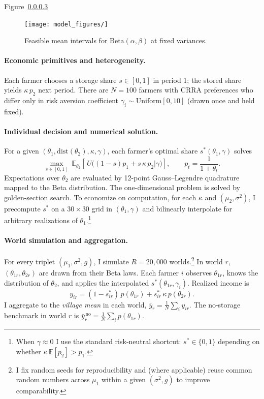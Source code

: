 Figure~\ref{}



\begin{figure}[ht!]
    \centering
    \texttt{[image: model\_figures/]}
    \caption{Feasible mean intervals for $\text{Beta}(\alpha,\beta)$ at fixed variances.}
    \label{fig:parameter_range_Beta_distribution}
\end{figure}


\paragraph{Economic primitives and heterogeneity.}
Each farmer chooses a storage share $s\in[0,1]$ in period 1; the stored share yields $\kappa\,p_2$ next period. There are $N=100$ farmers with CRRA preferences who differ only in risk aversion coefficient $\gamma_i\sim \mathrm{Uniform}[0,10]$ (drawn once and held fixed).

\paragraph{Individual decision and numerical solution.}
For a given $(\theta_1,\text{dist}(\theta_2),\kappa,\gamma)$, each farmer's optimal share $s^*(\theta_1,\gamma)$ solves
\[
\max_{s\in[0,1]} \; \mathbb{E}_{\theta_2}\!\left[\,U\!\big((1-s)p_1+s\,\kappa\,p_2|\gamma\big)\right],
\qquad p_t=\frac{1}{1+\theta_t}.
\]
Expectations over $\theta_2$ are evaluated by 12-point Gauss--Legendre quadrature mapped to the Beta distribution. The one-dimensional problem is solved by golden-section search. To economize on computation, for each $\kappa$ and $(\mu_2,\sigma^2)$, I precompute $s^*$ on a $30\times 30$ grid in $(\theta_1,\gamma)$ and bilinearly interpolate for arbitrary realizations of $\theta_1$.\footnote{When $\gamma\approx 0$ I use the standard risk-neutral shortcut: $s^*\in\{0,1\}$ depending on whether $\kappa\,\mathbb{E}[p_2]>p_1$.}

\paragraph{World simulation and aggregation.}
For every triplet $(\mu_1,\sigma^2,g)$, I simulate $R=20{,}000$ worlds.\footnote{I fix random seeds for reproducibility and (where applicable) reuse common random numbers across $\mu_1$ within a given $(\sigma^2,g)$ to improve comparability.} In world $r$, $(\theta_{1r},\theta_{2r})$ are drawn from their Beta laws. Each farmer $i$ observes $\theta_{1r}$, knows the distribution of $\theta_2$, and applies the interpolated $s^*(\theta_{1r},\gamma_i)$. Realized income is
$$
y_{ir}=(1-s^*_{ir})\,p(\theta_{1r})+s^*_{ir}\,\kappa\,p(\theta_{2r}).
$$
I aggregate to the \emph{village mean} in each world, $\bar y_r=\frac{1}{N}\sum_i y_{ir}$. The no-storage benchmark in world $r$ is $\bar y^{\,\text{no}}_r=\frac{1}{N}\sum_i p(\theta_{1r})$.

